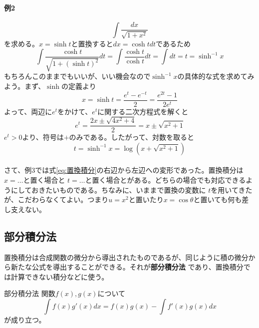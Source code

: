 \documentclass[a4j,dvipdfmx]{jsarticle}
\begin{document}
                \paragraph{例2}
                \begin{equation*}
                    \int \frac{dx}{\sqrt{1+x^2}}
                \end{equation*}
                を求める。$x=\sinh t$と置換すると$dx = \cosh t dt$であるため
                \begin{equation*}
                    \int \frac{\cosh t}{\sqrt{1+(\sinh t)^2}}dt=\int \frac{\cosh t}{\cosh t}dt=\int dt = t = \sinh^{-1} x
                \end{equation*}
                もちろんこのままでもいいが、いい機会なので$\sinh^{-1}x$の具体的な式を求めてみよう。まず、$\sinh$の定義より
                \begin{equation*}
                    x = \sinh t = \frac{e^t-e^{-t}}{2}=\frac{e^{2t}-1}{2e^t}
                \end{equation*}
                よって、両辺に$e^t$をかけて、$e^t$に関する二次方程式を解くと
                \begin{equation*}
                    e^{t} = \frac{2x\pm \sqrt{4x^2+4}}{2}=x\pm\sqrt{x^2+1}
                \end{equation*}
                $e^t>0$より、符号は$+$のみである。したがって、対数を取ると
                \begin{equation}
                    t=\sinh^{-1}x=\log\left(x+\sqrt{x^2+1}\right)\label{eq:arcsinh}
                \end{equation}\\

                さて、例3では式\ref{eq:置換積分}の右辺から左辺への変形であった。置換積分は$x=\dots$と置く場合と
                $t=\dots$と置く場合とがある。どちらの場合でも対応できるようにしておきたいものである。ちなみに、いままで置換の変数に
                $t$を用いてきたが、こだわらなくてよい。つまり$u=x^2$と置いたり$x=\cos\theta$と置いても何も差し支えない。
            \clearpage
            \subsection{部分積分法}
                置換積分は合成関数の微分から導出されたものであるが、同じように積の微分から新たな公式を導出することができる。それが\textbf{部分積分法}
                であり、置換積分では計算できない積分などに使う。
                \begin{itembox}{部分積分法}
                    関数$f(x),g(x)$について
                    \begin{equation}
                        \int f(x)g'(x) dx = f(x)g(x) - \int f'(x)g(x)dx \label{eq:部分積分法}
                    \end{equation}
                    が成り立つ。
                \end{itembox}
\end{document}
